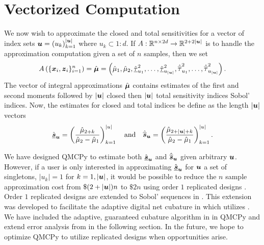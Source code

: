 \documentclass{article}
\begin{document}
\section{Vectorized Computation}

We now wish to approximate the closed and total sensitivities for a vector of index sets $\boldsymbol{u} = \left(u_k\right)_{k=1}^{\lvert \boldsymbol{u} \rvert}$ where $u_k \subset 1:d$. If $A: \mathbb{R}^{n \times 2d} \to \mathbb{R}^{2+2\lvert \boldsymbol{u} \rvert}$ is to handle the approximation computation given a set of $n$ samples, then we set
\begin{equation}
    A\left(\{\boldsymbol{x}_i,\boldsymbol{z}_i\}_{i=1}^n\right) = \hat{\boldsymbol{\mu}} = \left(\hat{\mu}_1,\hat{\mu}_2,\hat{\underline{\tau}}_{u_1}^2,\dots,\hat{\underline{\tau}}_{u_{\lvert \boldsymbol{u} \rvert}}^2,\hat{\overline{\tau}}_{u_1}^2,\dots,\hat{\overline{\tau}}_{u_{\lvert \boldsymbol{u} \rvert}}^2\right).
\end{equation}
The vector of integral approximations $\hat{\boldsymbol{\mu}}$ contains estimates of the first and second moments followed by $\lvert \boldsymbol{u} \rvert$ closed then $\lvert \boldsymbol{u} \rvert$ total sensitivity indices Sobol' indices. Now, the  estimates for closed and total indices be define as the length $\lvert \boldsymbol{u} \rvert$ vectors
\begin{equation}
    \hat{\underline{\boldsymbol{s}}}_{\boldsymbol{u}} = \left(\frac{\hat{\mu}_{2+k}}{\hat{\mu}_2-\hat{\mu}_1}\right)_{k=1}^{\lvert u \rvert} \quad \text{and} \quad 
    \hat{\overline{\boldsymbol{s}}}_{\boldsymbol{u}} = \left(\frac{\hat{\mu}_{2+\lvert \boldsymbol{u} \rvert + k}}{\hat{\mu}_2-\hat{\mu}_1}\right)_{k=1}^{\lvert u \rvert}.
\end{equation}

We have designed QMCPy to estimate both $\hat{\underline{\boldsymbol{s}}}_{\boldsymbol{u}}$ and $\hat{\overline{\boldsymbol{s}}}_{\boldsymbol{u}}$ given arbitrary $\boldsymbol{u}$. However, if a user is only interested in approximating $\hat{\underline{\boldsymbol{s}}}_{\boldsymbol{u}}$ for $\boldsymbol{u}$ a set of singletons, $\lvert u_k \rvert = 1$ for $k=1, \lvert \boldsymbol{u} \rvert$, it would be possible to reduce the $n$ sample approximation cost from $\$(2+\lvert \boldsymbol{u} \rvert)n$ to $\$2n$ using order $1$ replicated designs \cite{alex2008comparison,tissot2015randomized}. Order $1$ replicated designs are extended to Sobol' sequences  in \cite{replicated_designs_sobol_seq}. This extension was developed to facilitate the adaptive digital net cubature in \cite{reliable_sobol_indices_approx} which utilizes \cite{cubqmcsobol}. We have included the adaptive, guaranteed cubature algorithm in \cite{cubqmcsobol} in QMCPy and extend error analysis from \cite{reliable_sobol_indices_approx} in the following section. In the future, we hope to optimize QMCPy to utilize replicated designs when opportunities arise.
\end{document}
